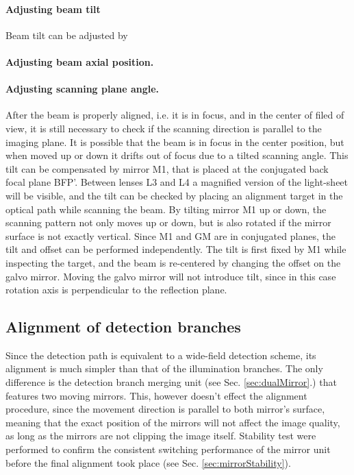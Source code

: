     \paragraph{Adjusting beam tilt}
      Beam tilt can be adjusted by 



    \paragraph{Adjusting beam axial position.}


    \paragraph{Adjusting scanning plane angle.}
      After the beam is properly aligned, i.e. it is in focus, and in the center of filed of view, it is still necessary to check if the scanning direction is parallel to the imaging plane. It is possible that the beam is in focus in the center position, but when moved up or down it drifts out of focus due to a tilted scanning angle. This tilt can be compensated by mirror M1, that is placed at the conjugated back focal plane BFP'. Between lenses L3 and L4 a magnified version of the light-sheet will be visible, and the tilt can be checked by placing an alignment target in the optical path while scanning the beam. By tilting mirror M1 up or down, the scanning pattern not only moves up or down, but is also rotated if the mirror surface is not exactly vertical. Since M1 and GM are in conjugated planes, the tilt and offset can be performed independently. The tilt is first fixed by M1 while inspecting the target, and the beam is re-centered by changing the offset on the galvo mirror. Moving the galvo mirror will not introduce tilt, since in this case rotation axis is perpendicular to the reflection plane.





  \subsection{Alignment of detection branches}
    Since the detection path is equivalent to a wide-field detection scheme, its alignment is much simpler than that of the illumination branches. The only difference is the detection branch merging unit (see Sec. \ref{sec:dualMirror}.) that features two moving mirrors. This, however doesn't effect the alignment procedure, since the movement direction is parallel to both mirror's surface, meaning that the exact position of the mirrors will not affect the image quality, as long as the mirrors are not clipping the image itself. Stability test were performed to confirm the consistent switching performance of the mirror unit before the final alignment took place (see Sec. \ref{sec:mirrorStability}).

